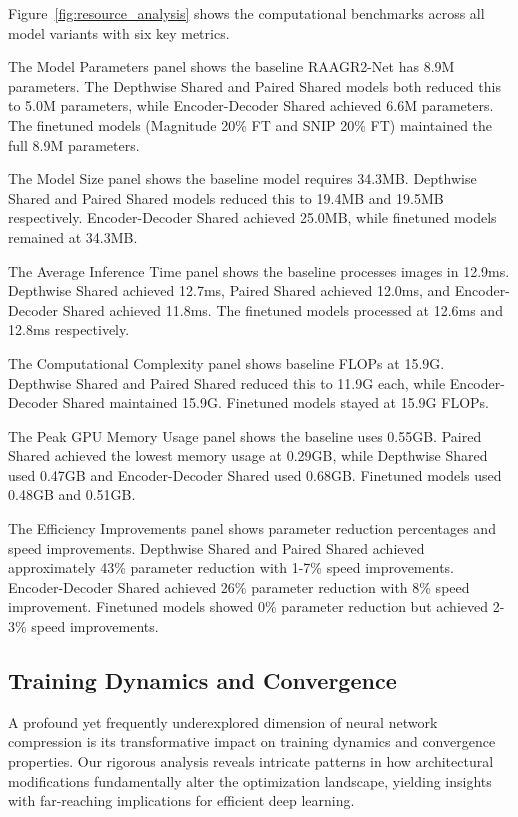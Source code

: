 \documentclass[12pt,a4paper]{article}
\begin{document}
\begin{enumerate}
Figure~\ref{fig:resource_analysis} shows the computational benchmarks across all model variants with six key metrics.

The Model Parameters panel shows the baseline RAAGR2-Net has 8.9M parameters. The Depthwise Shared and Paired Shared models both reduced this to 5.0M parameters, while Encoder-Decoder Shared achieved 6.6M parameters. The finetuned models (Magnitude 20\% FT and SNIP 20\% FT) maintained the full 8.9M parameters.

The Model Size panel shows the baseline model requires 34.3MB. Depthwise Shared and Paired Shared models reduced this to 19.4MB and 19.5MB respectively. Encoder-Decoder Shared achieved 25.0MB, while finetuned models remained at 34.3MB.

The Average Inference Time panel shows the baseline processes images in 12.9ms. Depthwise Shared achieved 12.7ms, Paired Shared achieved 12.0ms, and Encoder-Decoder Shared achieved 11.8ms. The finetuned models processed at 12.6ms and 12.8ms respectively.

The Computational Complexity panel shows baseline FLOPs at 15.9G. Depthwise Shared and Paired Shared reduced this to 11.9G each, while Encoder-Decoder Shared maintained 15.9G. Finetuned models stayed at 15.9G FLOPs.

The Peak GPU Memory Usage panel shows the baseline uses 0.55GB. Paired Shared achieved the lowest memory usage at 0.29GB, while Depthwise Shared used 0.47GB and Encoder-Decoder Shared used 0.68GB. Finetuned models used 0.48GB and 0.51GB.

The Efficiency Improvements panel shows parameter reduction percentages and speed improvements. Depthwise Shared and Paired Shared achieved approximately 43\% parameter reduction with 1-7\% speed improvements. Encoder-Decoder Shared achieved 26\% parameter reduction with 8\% speed improvement. Finetuned models showed 0\% parameter reduction but achieved 2-3\% speed improvements.

\subsection{Training Dynamics and Convergence}

A profound yet frequently underexplored dimension of neural network compression is its transformative impact on training dynamics and convergence properties. Our rigorous analysis reveals intricate patterns in how architectural modifications fundamentally alter the optimization landscape, yielding insights with far-reaching implications for efficient deep learning.


\end{enumerate}
\end{document}
